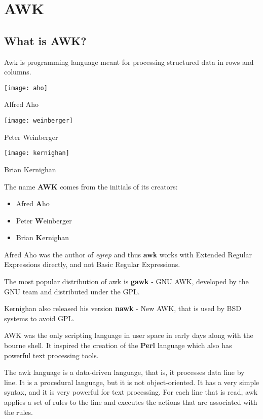 \chapter{AWK}

\section{What is AWK?}

Awk is programming language meant for processing structured data in rows and columns.

\begin{marginfigure}
  \texttt{[image: aho]}
  \caption{Alfred Aho}
\end{marginfigure}
\begin{marginfigure}
  \texttt{[image: weinberger]}
  \caption{Peter Weinberger}
\end{marginfigure}
\begin{marginfigure}
  \texttt{[image: kernighan]}
  \caption{Brian Kernighan}
\end{marginfigure}

The name \textbf{AWK} comes from the initials of its creators:
\begin{itemize}
\item Afred \textbf{A}ho
\item Peter \textbf{W}einberger
\item Brian \textbf{K}ernighan
\end{itemize}

\begin{remark}
  Afred Aho was the author of \textit{egrep} and thus \textbf{awk} works with Extended Regular Expressions directly, and not Basic Regular Expressions.
\end{remark}

The most popular distribution of awk is \textbf{gawk} - GNU AWK, developed by the GNU team and distributed under the GPL.

Kernighan also released his version \textbf{nawk} - New AWK, that is used by BSD systems to avoid GPL.

AWK was the only scripting language in user space in early days along with the bourne shell. It inspired the creation of the \textbf{Perl} language which also has powerful text processing tools.

The awk language is a data-driven language, that is, it processes data line by line. It is a procedural language, but it is not object-oriented.
It has a very simple syntax, and it is very powerful for text processing.
For each line that is read, awk applies a set of rules to the line and executes the actions that are associated with the rules.

